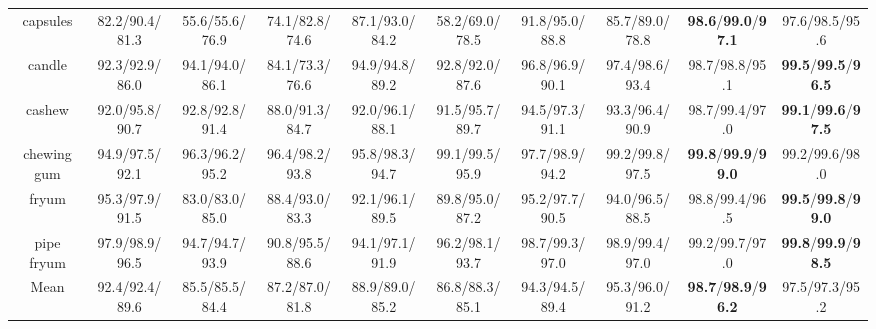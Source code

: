 \documentclass{article}
\theoremstyle{plain}
\theoremstyle{definition}
\theoremstyle{remark}
\begin{document}
\begin{table}[p]
{\begin{tabular}{ccccccccc>{\columncolor{oursblue}}c}
capsules    & 82.2/90.4/81.3 & 55.6/55.6/76.9 & 74.1/82.8/74.6 & 87.1/93.0/84.2 & 58.2/69.0/78.5 & 91.8/95.0/88.8 & 85.7/89.0/78.8 & \textbf{98.6}/\textbf{99.0}/\textbf{97.1} & 97.6/98.5/95.6 \\
\cellcolor{rowgray} candle & \cellcolor{rowgray} 92.3/92.9/86.0 & \cellcolor{rowgray} 94.1/94.0/86.1 & \cellcolor{rowgray} 84.1/73.3/76.6 & \cellcolor{rowgray} 94.9/94.8/89.2 & \cellcolor{rowgray} 92.8/92.0/87.6 & \cellcolor{rowgray} 96.8/96.9/90.1 & \cellcolor{rowgray} 97.4/98.6/93.4 & \cellcolor{rowgray} 98.7/98.8/95.1 & \textbf{99.5}/\textbf{99.5}/\textbf{96.5} \\
\midrule
cashew      & 92.0/95.8/90.7 & 92.8/92.8/91.4 & 88.0/91.3/84.7 & 92.0/96.1/88.1 & 91.5/95.7/89.7 & 94.5/97.3/91.1 & 93.3/96.4/90.9 & 98.7/99.4/97.0 & \textbf{99.1}/\textbf{99.6}/\textbf{97.5} \\
\cellcolor{rowgray} chewing gum & \cellcolor{rowgray} 94.9/97.5/92.1 & \cellcolor{rowgray} 96.3/96.2/95.2 & \cellcolor{rowgray} 96.4/98.2/93.8 & \cellcolor{rowgray} 95.8/98.3/94.7 & \cellcolor{rowgray} 99.1/99.5/95.9 & \cellcolor{rowgray} 97.7/98.9/94.2 & \cellcolor{rowgray} 99.2/99.8/97.5 & \cellcolor{rowgray} \textbf{99.8}/\textbf{99.9}/\textbf{99.0} & 99.2/99.6/98.0 \\
fryum       & 95.3/97.9/91.5 & 83.0/83.0/85.0 & 88.4/93.0/83.3 & 92.1/96.1/89.5 & 89.8/95.0/87.2 & 95.2/97.7/90.5 & 94.0/96.5/88.5 & 98.8/99.4/96.5 & \textbf{99.5}/\textbf{99.8}/\textbf{99.0} \\
\cellcolor{rowgray} pipe fryum & \cellcolor{rowgray} 97.9/98.9/96.5 & \cellcolor{rowgray} 94.7/94.7/93.9 & \cellcolor{rowgray} 90.8/95.5/88.6 & \cellcolor{rowgray} 94.1/97.1/91.9 & \cellcolor{rowgray} 96.2/98.1/93.7 & \cellcolor{rowgray} 98.7/99.3/97.0 & \cellcolor{rowgray} 98.9/99.4/97.0 & \cellcolor{rowgray} 99.2/99.7/97.0 & \textbf{99.8}/\textbf{99.9}/\textbf{98.5} \\
\cmidrule(lr){1-9}
Mean        & 92.4/92.4/89.6 & 85.5/85.5/84.4 & 87.2/87.0/81.8 & 88.9/89.0/85.2 & 86.8/88.3/85.1 & 94.3/94.5/89.4 & 95.3/96.0/91.2 & \textbf{98.7}/\textbf{98.9}/\textbf{96.2} & 97.5/97.3/95.2 \\
\bottomrule
\end{tabular}
}
\end{table}
\end{document}
